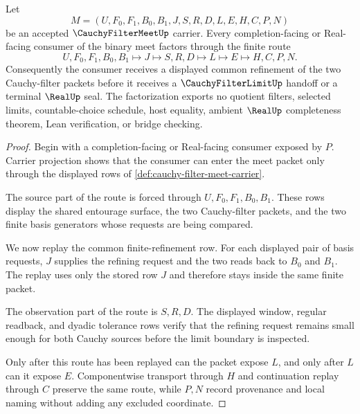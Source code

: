 \begin{theorem}
\label{thm:cauchy-filter-meet-common-refinement-factorization}
Let
$$
M=(U,F_0,F_1,B_0,B_1,J,S,R,D,L,E,H,C,P,N)
$$
be an accepted $\CauchyFilterMeetUp$ carrier. Every completion-facing or Real-facing consumer of the binary meet factors through the finite route
$$
U,F_0,F_1,B_0,B_1 \longmapsto J \longmapsto S,R,D \longmapsto L \longmapsto E \longmapsto H,C,P,N .
$$
Consequently the consumer receives a displayed common refinement of the two Cauchy-filter packets before it receives a $\CauchyFilterLimitUp$ handoff or a terminal $\RealUp$ seal. The factorization exports no quotient filters, selected limits, countable-choice schedule, host equality, ambient $\RealUp$ completeness theorem, Lean verification, or bridge checking.
\end{theorem}
\begin{proof}
Begin with a completion-facing or Real-facing consumer exposed by $P$. Carrier projection shows that the consumer can enter the meet packet only through the displayed rows of \autoref{def:cauchy-filter-meet-carrier}.

The source part of the route is forced through $U,F_0,F_1,B_0,B_1$. These rows display the shared entourage surface, the two Cauchy-filter packets, and the two finite basis generators whose requests are being compared.

We now replay the common finite-refinement row. For each displayed pair of basis requests, $J$ supplies the refining request and the two reads back to $B_0$ and $B_1$. The replay uses only the stored row $J$ and therefore stays inside the same finite packet.

The observation part of the route is $S,R,D$. The displayed window, regular readback, and dyadic tolerance rows verify that the refining request remains small enough for both Cauchy sources before the limit boundary is inspected.

Only after this route has been replayed can the packet expose $L$, and only after $L$ can it expose $E$. Componentwise transport through $H$ and continuation replay through $C$ preserve the same route, while $P,N$ record provenance and local naming without adding any excluded coordinate.
\end{proof}

